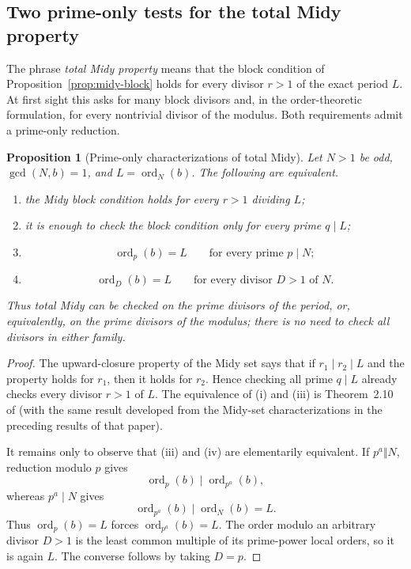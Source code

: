 \documentclass[11pt]{article}
\newtheorem{proposition}[theorem]{Proposition}
\newcommand{\ord}{\operatorname{ord}}
\begin{document}
\subsection{Two prime-only tests for the total Midy property}

The phrase \emph{total Midy property} means that the block condition of
Proposition~\ref{prop:midy-block} holds for every divisor $r>1$ of the exact
period $L$.  At first sight this asks for many block divisors and, in the
order-theoretic formulation, for every nontrivial divisor of the modulus.
Both requirements admit a prime-only reduction.

\begin{proposition}[Prime-only characterizations of total Midy]
\label{prop:total-midy-prime-only}
Let $N>1$ be odd, $\gcd(N,b)=1$, and $L=\ord_N(b)$.  The following are
equivalent.
\begin{enumerate}[label=(\roman*)]
\item the Midy block condition holds for every $r>1$ dividing $L$;
\item it is enough to check the block condition only for every \emph{prime}
      $q\mid L$;
\item
\[
\ord_p(b)=L\qquad\text{for every prime }p\mid N;
\]
\item
\[
\ord_D(b)=L\qquad\text{for every divisor }D>1\text{ of }N.
\]
\end{enumerate}
Thus total Midy can be checked on the prime divisors of the period, or,
equivalently, on the prime divisors of the modulus; there is no need to check
all divisors in either family.
\end{proposition}

\begin{proof}
The upward-closure property of the Midy set says that if $r_1\mid r_2\mid L$
and the property holds for $r_1$, then it holds for $r_2$.  Hence checking
all prime $q\mid L$ already checks every divisor $r>1$ of $L$.  The
equivalence of (i) and (iii) is Theorem~2.10 of
\cite{Castillo2015} (with the same result developed from the Midy-set
characterizations in the preceding results of that paper).

It remains only to observe that (iii) and (iv) are elementarily equivalent.
If $p^a\Vert N$, reduction modulo $p$ gives
\[
\ord_p(b)\mid\ord_{p^a}(b),
\]
whereas $p^a\mid N$ gives
\[
\ord_{p^a}(b)\mid\ord_N(b)=L.
\]
Thus $\ord_p(b)=L$ forces $\ord_{p^a}(b)=L$.  The order modulo an arbitrary
divisor $D>1$ is the least common multiple of its prime-power local orders,
so it is again $L$.  The converse follows by taking $D=p$.
\end{proof}
\end{document}
